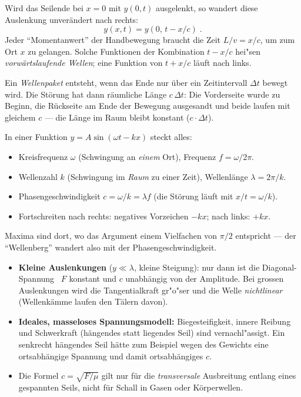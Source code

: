 \begin{werkzeugkasten}
Wird das Seilende bei $x=0$ mit $y(0,t)$ ausgelenkt, so wandert diese
Auslenkung unverändert nach rechts:
\begin{equation}
  y(x,t)=y(0,\,t-x/c)\;.
\end{equation}
Jeder ``Momentanwert'' der Handbewegung braucht die Zeit $L/v=x/c$, um zum Ort
$x$ zu gelangen. Solche Funktionen der Kombination $t-x/c$ hei"sen
\emph{vorwärtslaufende Wellen}; eine Funktion von $t+x/c$ läuft nach links.

Ein \emph{Wellenpaket} entsteht, wenn das Ende nur über ein Zeitintervall
$\Delta t$ bewegt wird. Die Störung hat dann räumliche Länge $c\,\Delta t$:
Die Vorderseite wurde zu Beginn, die Rückseite am Ende der Bewegung
ausgesandt und beide laufen mit gleichem $c$ --- die Länge im Raum bleibt
konstant ($c\cdot\Delta t$).
\end{werkzeugkasten}

\begin{werkzeugkasten}
In einer Funktion $y=A\sin(\omega t-kx)$ steckt alles:
\begin{itemize}
  \item Kreisfrequenz $\omega$ (Schwingung an \emph{einem} Ort),
        Frequenz $f=\omega/2\pi$.
  \item Wellenzahl $k$ (Schwingung im \emph{Raum} zu einer Zeit),
        Wellenlänge $\lambda=2\pi/k$.
  \item Phasengeschwindigkeit $c=\omega/k=\lambda f$ (die Störung läuft mit
        $x/t=\omega/k$).
  \item Fortschreiten nach rechts: negatives Vorzeichen $-kx$; nach links:
        $+kx$.
\end{itemize}
Maxima sind dort, wo das Argument einem Vielfachen von $\pi/2$ entspricht ---
der ``Wellenberg'' wandert also mit der Phasengeschwindigkeit.
\end{werkzeugkasten}

\begin{achtung}
\begin{itemize}
  \item \textbf{Kleine Auslenkungen} ($y\ll\lambda$, kleine Steigung):
        nur dann ist die Diagonal-Spannung ~$F$ konstant und $c$ unabhängig
        von der Amplitude. Bei grossen Auslenkungen wird die Tangentialkraft
        gr"o"ser und die Welle \emph{nichtlinear} (Wellenkämme laufen den
        Tälern davon).
  \item \textbf{Ideales, masseloses Spannungsmodell:} Biegesteifigkeit,
        innere Reibung und Schwerkraft (hängendes statt liegendes Seil) sind
        vernachl"assigt. Ein senkrecht hängendes Seil hätte zum Beispiel
        wegen des Gewichts eine ortsabhängige Spannung und damit
        ortsabhängiges $c$.
  \item Die Formel $c=\sqrt{F/\mu}$ gilt nur für die \emph{transversale}
        Ausbreitung entlang eines gespannten Seils, nicht für Schall in
        Gasen oder Körperwellen.
\end{itemize}
\end{achtung}
